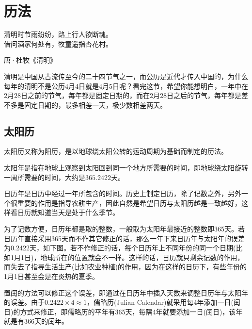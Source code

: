 
\chapter{历法}
\label{chap:calendar}

\epigraph{清明时节雨纷纷，路上行人欲断魂。\\借问酒家何处有，牧童遥指杏花村。}{唐·杜牧《清明》}

清明是中国从古流传至今的二十四节气之一，而公历是近代才传入中国的，为什么每年的清明不是公历4月4日就是4月5日呢？看完这节，希望你能想明白，一年中在2月28日之前的节气，每年都是固定日期的，而在2月28日之后的节气，每年都是差不多是固定日期的，最多相差一天，极少数相差两天。

\section{太阳历}
\label{sec:solar-calendars}

太阳历又称为阳历，是以地球绕太阳公转的运动周期为基础而制定的历法。

\begin{definition}
  太阳年是指在地球上观察到太阳回到同一个地方所需要的时间，即地球绕太阳旋转一周所需要的时间，大约是$365.2422$天。
\end{definition}

日历年是日历中经过一年所包含的时间。历史上制定日历，除了记数之外，另外一个很重要的作用是指导农耕生产，因此自然是希望日历与太阳历越是一致越好，这样看日历就知道当天是处于什么季节。

为了记数方便，日历年都是取的整数，一般取为太阳年最接近的整数即365天。若日历年直接采用365天而不作其它修正的话，那么一年下来日历年与太阳年的误差为0.2422天，如下图。若不作修正的话，每个日历年上不同年份的同一个日期(比如1月1日)，地球所在的位置就会不一样。这样的话，日历就只剩余记数的作用，而失去了指导生活生产(比如农业种植)的作用，因为在这样的日历下，有些年份的1月1日甚至会是在炎热的夏季。

置闰的方法可以修正这个误差，即通过在日历年中插入天数来调整日历年与太阳年的误差。由于$0.2422\times4\approx1$，儒略历(Julian Calendar)就采用每4年添加一日(闰日)的方式来修正，即儒略历的平年有365天，每隔4年就要添加一日(闰日)，该年就是有366天的闰年。

